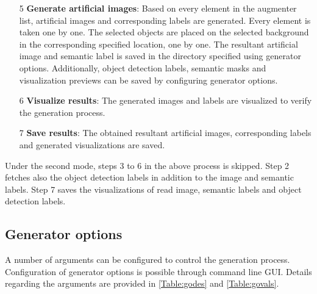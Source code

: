 \begin{itemize}
		\item[5] \textbf{Generate artificial images}: Based on every element in the augmenter list, artificial images and corresponding labels are generated. Every element is taken one by one. The selected objects are placed on the selected background in the corresponding specified location, one by one. The resultant artificial image and semantic label is saved in the directory specified using generator options. Additionally, object detection labels, semantic masks and visualization previews can be saved by configuring generator options.
		\item[6] \textbf{Visualize results}: The generated images and labels are visualized to verify the generation process.
		\item[7] \textbf{Save results}: The obtained resultant artificial images, corresponding labels and generated visualizations are saved.
	\end{itemize}
	
Under the second mode, steps 3 to 6 in the above process is skipped. Step 2 fetches also the object detection labels in addition to the image and semantic labels. Step 7 saves the visualizations of read image, semantic labels and object detection labels.
		

\subsection{Generator options}

A number of arguments can be configured to control the generation process. Configuration of generator options is possible through command line GUI. Details regarding the arguments are provided in \ref{Table:godes} and \ref{Table:govals}. 

